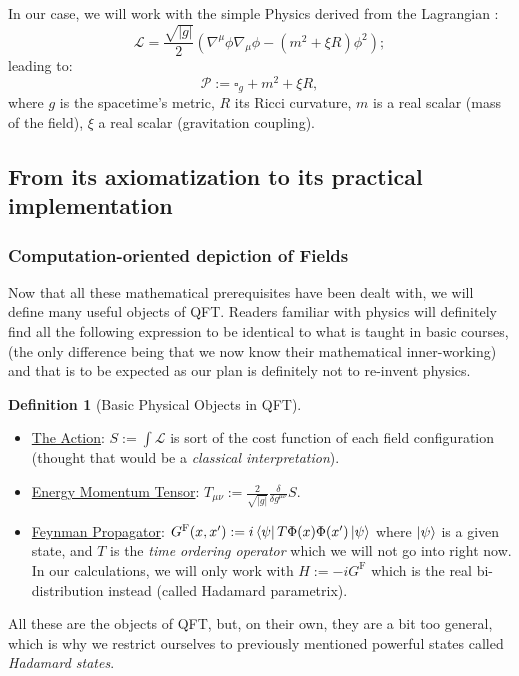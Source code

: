 \documentclass[a4paper,11pt]{article}
\numberwithin{equation}{section}
\theoremstyle{definition}
\newtheorem{definition}{Definition}
\begin{document}
\noindent In our case, we will work with the simple Physics derived from the Lagrangian :
        \begin{equation}
        \mathcal{L}=\frac{\sqrt{|g|}}{2}\left(\nabla^\mu\phi\nabla_\mu\phi- (m^2+\xi R)\phi^2\right);
        \end{equation}
        leading to:
        \begin{equation}
        \mathcal{P}:=\square_g + m^2 + \xi R,
        \end{equation}
        where $g$ is the spacetime's metric, $R$ its Ricci curvature, $m$ is a real scalar (mass of the field), $\xi$ a real scalar (gravitation coupling).

        
\subsection{From its axiomatization to its practical implementation}
\subsubsection{Computation-oriented depiction of Fields}
        Now that all these mathematical prerequisites have been dealt with, we will define many useful objects of QFT. Readers familiar with physics will definitely find all the following expression to be identical to what is taught in basic courses, (the only difference being that we now know their mathematical inner-working) and that is to be expected as our plan is definitely not to re-invent physics.

        \begin{definition}[Basic Physical Objects in QFT]$\quad$
        \begin{itemize}
            \item \underline{The Action}: $S:= \int \mathcal{L}$ is sort of the cost function of each field configuration (thought that would be a \emph{classical interpretation}).
            \item \underline{Energy Momentum Tensor}: $T_{\mu\nu}:=\frac{2}{\sqrt{|g|}}\frac{\delta}{\delta g^{\mu\nu}}S.$
            \item \underline{Feynman Propagator}: $G^\mathrm{F}(x,x'):=i\bra{\psi}T\Phi(x)\Phi(x')\ket{\psi}$ where $\ket{\psi}$ is a given state, and $T$ is the \emph{time ordering operator} which we will not go into right now. In our calculations, we will only work with $H:=-iG^\mathrm{F}$ which is the real bi-distribution instead (called Hadamard parametrix). 
        \end{itemize}
        \end{definition}
        All these are the objects of QFT, but, on their own, they are a bit too general, which is why we restrict ourselves to previously mentioned powerful states called \emph{Hadamard states}.
\end{document}
